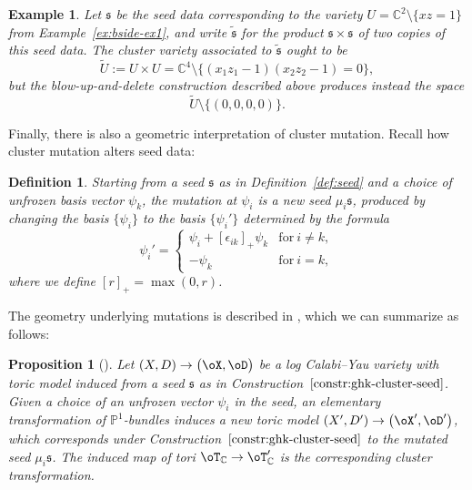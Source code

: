 \documentclass[10pt,a4paper]{amsart}
\numberwithin{equation}{section}
\newtheorem{Proposition}[Theorem]{Proposition}
\newtheorem{Definition}[Theorem]{Definition}
\newtheorem{Example}[Theorem]{Example}
\def\CC{\mathbb{C}}
\def\PP{\mathbb{P}}
\newcommand\frs{\mathfrak{s}}
\begin{document}
\begin{Example}\label{ex:nontruncated}
 Let $\frs$ be the seed data corresponding to the variety $U=\CC^2\setminus \{xz=1\}$ from Example~\ref{ex:bside-ex1}, and write $\widetilde{\frs}$ for the product $\frs\times \frs$ of two copies of this seed data. The cluster variety associated to $\widetilde{\frs}$ ought to be
 \[
 \widetilde{U}:=U\times U = \CC^4\setminus \{(x_1z_1-1)(x_2z_2-1)=0\},
 \]
 but the blow-up-and-delete construction described above produces instead the space
 \[
 \widetilde{U} \setminus \{(0,0,0,0)\}.
 \]
\end{Example}

Finally, there is also a geometric interpretation of cluster mutation. Recall how cluster mutation alters seed data:

\begin{Definition}\label{def:mutation}
 Starting from a seed $\frs$ as in Definition~\ref{def:seed} and a choice of unfrozen basis vector $\psi_k$, the {\em mutation at $\psi_i$} is a new seed $\mu_i\frs$, produced by changing the basis $\{\psi_i\}$ to the basis $\{\psi_i'\}$ determined by the formula
 \[
 \psi_i' = \begin{cases}
 \psi_i + [\epsilon_{ik}]_+\psi_k & \text{for}\ i\neq k,
 \\
 -\psi_k & \text{for}\ i=k,
 \end{cases}
 \]
 where we define $[r]_+ = \max(0,r)$.
\end{Definition}

The geometry underlying mutations is described in \cite[Section 3.1]{GHK2}, which we can summarize as follows:
\begin{Proposition}[{\cite{GHK2}}]\label{prop:bside-mut}
 Let $(X,D)\to \big(\oX,\oD\big)$ be a log Calabi--Yau variety with toric model induced from a seed $\frs$ as in Construction~$\ref{constr:ghk-cluster-seed}$. Given a choice of an unfrozen vector $\psi_i$ in the seed, an elementary transformation of $\PP^1$-bundles induces a new toric model $(X',D')\to \big(\oX',\oD'\big)$, which corresponds under Construction~$\ref{constr:ghk-cluster-seed}$ to the mutated seed $\mu_i\frs$. The induced map of tori $\oT_\CC\to\oT_\CC'$ is the corresponding cluster transformation.
\end{Proposition}
\end{document}
